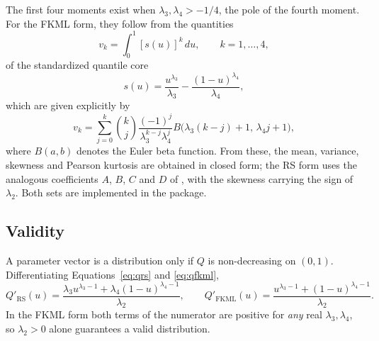 The first four moments exist when $\lambda_3, \lambda_4 > -1/4$, the pole of the
fourth moment. For the FKML form, they follow from the quantities
\begin{equation}
    v_k = \int_{0}^{1} [s(u)]^k \, du, \qquad k = 1, \ldots, 4,
\end{equation}
of the standardized quantile core
\begin{equation}
    s(u) = \frac{u^{\lambda_3}}{\lambda_3} - \frac{(1-u)^{\lambda_4}}{\lambda_4},
    \label{eq:su_definition}
\end{equation}
which are given explicitly by
\begin{equation}
    v_k = \sum_{j=0}^{k} \binom{k}{j} \frac{(-1)^j}{\lambda_3^{k-j} \lambda_4^j}
    B\big(\lambda_3(k-j)+1, \, \lambda_4 j+1\big),
    \label{eq:vk_beta}
\end{equation}
where $B(a, b)$ denotes the Euler beta function. From these, the mean, variance,
skewness and Pearson kurtosis are obtained in closed form; the RS form uses the
analogous coefficients $A$, $B$, $C$ and $D$ of \textcite{RambergSchmeiser1974},
with the skewness carrying the sign of $\lambda_2$. Both sets are implemented in
the package.

\subsection{Validity}\label{subsec:validity}

A parameter vector is a distribution only if $Q$ is non-decreasing on $(0,1)$.
Differentiating Equations~\eqref{eq:qrs} and \eqref{eq:qfkml},
\begin{equation}
    Q'_{\mathrm{RS}}(u) =
    \frac{\lambda_3 u^{\lambda_3-1} + \lambda_4 (1-u)^{\lambda_4-1}}{\lambda_2},
    \qquad
    Q'_{\mathrm{FKML}}(u) =
    \frac{u^{\lambda_3-1} + (1-u)^{\lambda_4-1}}{\lambda_2}.
    \label{eq:qprime}
\end{equation}
In the FKML form both terms of the numerator are positive for \emph{any} real
$\lambda_3, \lambda_4$, so $\lambda_2 > 0$ alone guarantees a valid
distribution.

